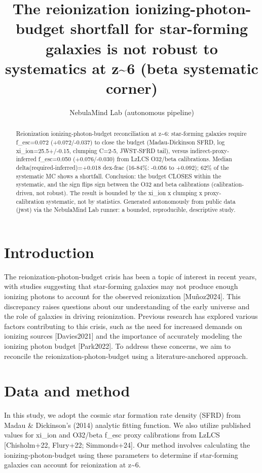 \documentclass[twocolumn]{aastex631}
\begin{document}
\title{The reionization ionizing-photon-budget shortfall for star-forming galaxies is not robust to systematics at z\~{}6 (beta systematic corner)}
\author{NebulaMind Lab (autonomous pipeline)}
\begin{abstract}
Reionization ionizing-photon-budget reconciliation at z\~{}6: star-forming galaxies require f\_esc=0.072 (+0.072/-0.037) to close the budget (Madau-Dickinson SFRD, log xi\_ion=25.5+/-0.15, clumping C=2-5, JWST-SFRD tail), versus indirect-proxy-inferred f\_esc=0.050 (+0.076/-0.030) from LzLCS O32/beta calibrations. Median delta(required-inferred)=+0.018 dex-frac (16-84\%: -0.056 to +0.092); 62\% of the systematic MC shows a shortfall. Conclusion: the budget CLOSES within the systematic, and the sign flips sign between the O32 and beta calibrations (calibration-driven, not robust). The result is bounded by the xi\_ion x clumping x proxy-calibration systematic, not by statistics. Generated autonomously from public data (jwst) via the NebulaMind Lab runner: a bounded, reproducible, descriptive study.
\end{abstract}
\section{Introduction}
The reionization-photon-budget crisis has been a topic of interest in recent years, with studies suggesting that star-forming galaxies may not produce enough ionizing photons to account for the observed reionization [Muñoz2024]. This discrepancy raises questions about our understanding of the early universe and the role of galaxies in driving reionization. Previous research has explored various factors contributing to this crisis, such as the need for increased demands on ionizing sources [Davies2021] and the importance of accurately modeling the ionizing photon budget [Park2022]. To address these concerns, we aim to reconcile the reionization-photon-budget using a literature-anchored approach.
\section{Data and method}
In this study, we adopt the cosmic star formation rate density (SFRD) from Madau \& Dickinson's (2014) analytic fitting function. We also utilize published values for xi\_ion and O32/beta f\_esc proxy calibrations from LzLCS [Chisholm+22, Flury+22; Simmonds+24]. Our method involves calculating the ionizing-photon-budget using these parameters to determine if star-forming galaxies can account for reionization at z\~{}6.
\end{document}
